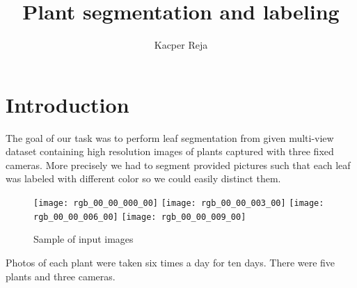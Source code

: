 \documentclass[10pt]{article}
\title{\Large Plant segmentation and labeling}
\author{Kacper Reja}
\date{}
\begin{document}
\maketitle

\tableofcontents
\clearpage
\section{Introduction}
The goal of our task was to perform leaf segmentation from given multi-view dataset containing high resolution images of plants captured with three fixed cameras. More precisely we had to segment provided pictures such that each leaf was labeled with different color so we could easily distinct them.
\begin{figure}[H]
\caption{Sample of input images}
\texttt{[image: rgb\_00\_00\_000\_00]}
\texttt{[image: rgb\_00\_00\_003\_00]}
\texttt{[image: rgb\_00\_00\_006\_00]}
\texttt{[image: rgb\_00\_00\_009\_00]}
\end{figure}

Photos of each plant were taken six times a day for ten days. There were five plants and three cameras.
\clearpage
\end{document}

